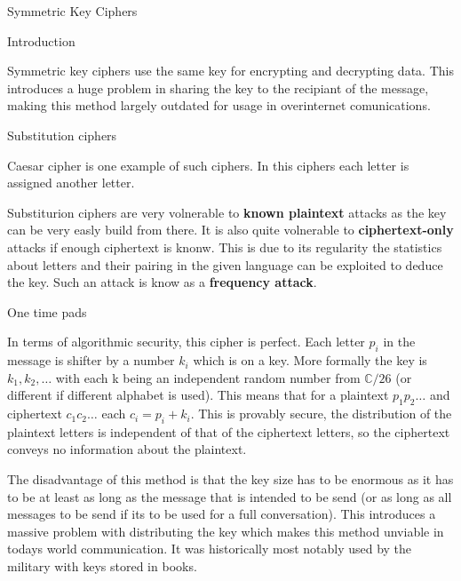 \documentclass[12pt, letterpaper]{article}
\begin{document}
\begin{section}{Symmetric Key Ciphers}

  \begin{subsection}{Introduction}

    Symmetric key ciphers use the same key for encrypting and decrypting data.
    This introduces a huge problem in sharing the key to the recipiant of the
    message, making this method largely outdated for usage in overinternet
    comunications.

  \end{subsection}

  \begin{subsection}{Substitution ciphers}

    Caesar cipher is one example of such ciphers. In this ciphers each letter is
    assigned another letter.

    Substiturion ciphers are very volnerable to \textbf{known plaintext} attacks
    as the key can be very easly build from there. It is also quite volnerable
    to \textbf{ciphertext-only} attacks if enough ciphertext is knonw. This is
    due to its regularity the statistics about letters and their pairing in the
    given language can be exploited to deduce the key. Such an attack is know
    as a \textbf{frequency attack}.

  \end{subsection}

  \begin{subsection}{One time pads}

    In terms of algorithmic security, this cipher is perfect. Each letter
    \(p_{i}\) in the message is shifter by a number \(k_{i}\) which is on a key.
    More formally the key is \(k_{1}, k_{2}, \dots\) with each k being an
    independent random number from \(\mathbb{C}/26\) (or different if different
    alphabet is used). This means that for a plaintext \(p_{1}p_{2} \dots\) and
    ciphertext \(c_{1}c_{2} \dots\) each \(c_{i} = p_{i} + k_{i}\). This is
    provably secure, the distribution of the plaintext letters is independent of
    that of the ciphertext letters, so the ciphertext conveys no information
    about the plaintext.

    The disadvantage of this method is that the key size has to be enormous as
    it has to be at least as long as the message that is intended to be send (or
    as long as all messages to be send if its to be used for a full
    conversation). This introduces a massive problem with distributing the key
    which makes this method unviable in todays world communication. It was
    historically most notably used by the military with keys stored in books.


\end{subsection}
\end{section}
\end{document}
